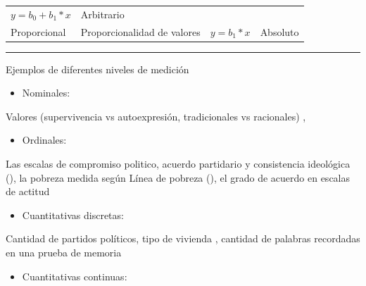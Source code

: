 \documentclass[]{book}
\providecommand{\tightlist}{%
  \setlength{\itemsep}{0pt}\setlength{\parskip}{0pt}}
\begin{document}
\begin{longtable}[]{@{}llll@{}}
\begin{minipage}[t]{0.32\columnwidth}
\(y = b_0 + b_1*x\)\strut
\end{minipage} & \begin{minipage}[t]{0.14\columnwidth}\raggedright
Arbitrario\strut
\end{minipage}\tabularnewline
\begin{minipage}[t]{0.14\columnwidth}\raggedright
Proporcional\strut
\end{minipage} & \begin{minipage}[t]{0.29\columnwidth}\raggedright
Proporcionalidad de valores\strut
\end{minipage} & \begin{minipage}[t]{0.32\columnwidth}\raggedright
\(y = b_1*x\)\strut
\end{minipage} & \begin{minipage}[t]{0.14\columnwidth}\raggedright
Absoluto\strut
\end{minipage}\tabularnewline
\bottomrule
\end{longtable}

\begin{center}\rule{0.5\linewidth}{\linethickness}\end{center}

Ejemplos de diferentes niveles de medición

\begin{itemize}
\tightlist
\item
  Nominales:
\end{itemize}

Valores (supervivencia vs autoexpresión, tradicionales vs racionales) \citet{Inglehart2018}, \citet{Norris2011}

\begin{itemize}
\tightlist
\item
  Ordinales:
\end{itemize}

Las escalas de compromiso politico, acuerdo partidario y consistencia ideológica (\citet{Doherty2016}), la pobreza medida según Línea de pobreza (\citet{INDEC2016}), el grado de acuerdo en escalas de actitud \citet{Robinson2014}

\begin{itemize}
\tightlist
\item
  Cuantitativas discretas:
\end{itemize}

Cantidad de partidos políticos, tipo de vivienda \citet{INDEC2018}, cantidad de palabras recordadas en una prueba de memoria

\begin{itemize}
\tightlist
\item
  Cuantitativas continuas:
\end{itemize}
\end{document}
